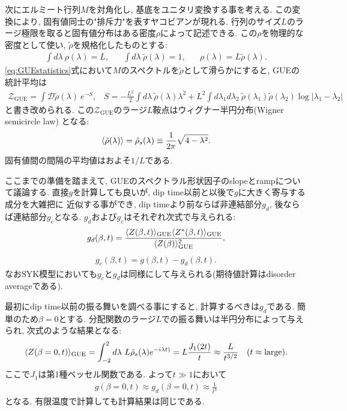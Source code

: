 次にエルミート行列$M$を対角化し, 基底をユニタリ変換する事を考える. 
この変換により, 固有値同士の"排斥力"を表すヤコビアンが現れる. 
行列のサイズ$L$のラージ極限を取ると固有値分布はある密度$\rho$によって記述できる. 
この$\rho$を物理的な密度として使い, $\tilde{\rho}$を規格化したものとする:
\begin{align}
	\int d\lambda\ \rho(\lambda) = L,\hspace{20pt}
	\int d\lambda\ \tilde{\rho}(\lambda) = 1,\hspace{20pt}
	\rho(\lambda) = L\tilde{\rho}(\lambda).
\end{align}
\eqref{eq:GUEstatistics}式において$M$のスペクトルを$\tilde{\rho}$として滑らかにすると, 
GUEの統計平均は
\begin{align}
	\mathcal{Z}_{\mathrm{GUE}} = \int \mathcal{D}\tilde{\rho}(\lambda)\ e^{-S},
	\hspace{10pt}
	S 
	= -\frac{L^2}{2} \int d\lambda\ \tilde{\rho}(\lambda)\lambda^2
	+ L^2 \int d\lambda_1 d\lambda_2\ \tilde{\rho}(\lambda_1)\tilde{\rho}(\lambda_2)
		\log|\lambda_1 - \lambda_2|
	\label{eq:GUEstatistics_in_large_L}
\end{align}
と書き改められる. 
この$\mathcal{Z}_{\mathrm{GUE}}$のラージ$L$鞍点はウィグナー半円分布(Wigner semicircle law)
となる:
\begin{align}
	\langle \tilde{\rho}(\lambda) \rangle = \tilde{\rho}_s(\lambda)\equiv
	\frac{1}{2\pi}\sqrt{4 - \lambda^2}.
	\label{eq:semicircle_law}
\end{align}
固有値間の間隔の平均値はおよそ$1/L$である. 

ここまでの準備を踏まえて, GUEのスペクトラル形状因子のslopeとrampについて議論する. 
直接$g$を計算しても良いが, dip time以前と以後で$g$に大きく寄与する成分を大雑把に
近似する事ができ, dip timeより前ならば非連結部分$g_d$, 後ならば連結部分$g_c$となる. 
$g_d$および$g_c$はそれぞれ次式で与えられる:
\begin{align}
	g_d(\beta, t)
	= \frac{\langle Z(\beta, t) \rangle_{\mathrm{GUE}}\langle Z^*(\beta, t) \rangle_{\mathrm{GUE}}}
		{\langle Z(\beta) \rangle_{\mathrm{GUE}}^2},
	\label{eq:disconnected_piece}
\end{align}
\begin{align}
	g_c(\beta, t) = g(\beta, t) - g_d(\beta, t).
	\label{eq:connected_piece}
\end{align}
なおSYK模型においても$g_c$と$g_d$は同様にして与えられる(期待値計算はdisorder averageである). 

最初にdip time以前の振る舞いを調べる事にすると, 計算するべきは$g_d$である. 
簡単のため$\beta = 0$とする. 
分配関数のラージ$L$での振る舞いは半円分布によって与えられ, 次式のような結果となる:
\begin{align}
	\langle Z(\beta=0, t) \rangle_{\mathrm{GUE}}
	= \int_{-2}^2 d\lambda\ L\tilde{\rho}_s(\lambda)e^{-i\lambda t)}
	= L\frac{J_1(2t)}{t}
	\approx \frac{L}{t^{3/2}}
	\hspace{10pt}(t \approx \mathrm{large}).
\end{align}
ここで$J_1$は第1種ベッセル関数である. 
よって$t \gg 1$において
\begin{align}
	g(\beta = 0, t) \approx g_d(\beta = 0, t) \approx \frac{1}{t^3}
	\label{eq:late_time_slope_in_RMT}
\end{align}
となる. 有限温度で計算しても計算結果は同じである. 

